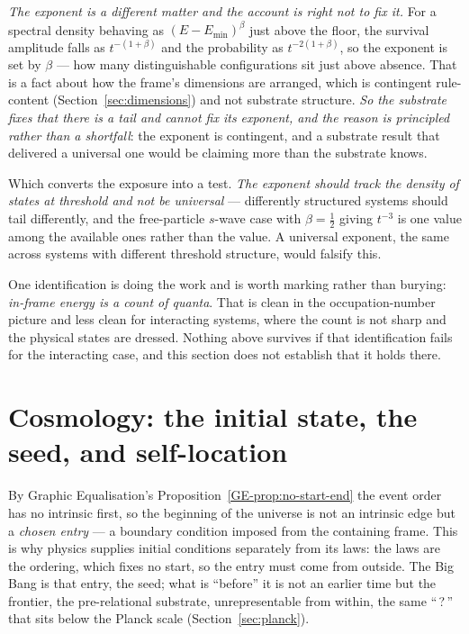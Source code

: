 \documentclass[11pt,a4paper]{article}
\theoremstyle{remark}\newtheorem{remark}[definition]{Remark}
\begin{document}
\emph{The exponent is a different matter and the account is right not to fix it.} For a spectral
density behaving as $(E-E_{\min})^{\beta}$ just above the floor, the survival amplitude falls as
$t^{-(1+\beta)}$ and the probability as $t^{-2(1+\beta)}$, so the exponent is set by $\beta$ --- how
many distinguishable configurations sit just above absence. That is a fact about how the frame's
dimensions are arranged, which is contingent rule-content (Section~\ref{sec:dimensions}) and not
substrate structure. \emph{So the substrate fixes that there is a tail and cannot fix its exponent,
and the reason is principled rather than a shortfall}: the exponent is contingent, and a substrate
result that delivered a universal one would be claiming more than the substrate knows.

Which converts the exposure into a test. \emph{The exponent should track the density of states at
threshold and not be universal} --- differently structured systems should tail differently, and the
free-particle $s$-wave case with $\beta=\tfrac12$ giving $t^{-3}$ is one value among the available
ones rather than the value. A universal exponent, the same across systems with different threshold
structure, would falsify this.

One identification is doing the work and is worth marking rather than burying: \emph{in-frame energy
is a count of quanta}. That is clean in the occupation-number picture and less clean for interacting
systems, where the count is not sharp and the physical states are dressed. Nothing above survives if
that identification fails for the interacting case, and this section does not establish that it
holds there.

\section{Cosmology: the initial state, the seed, and self-location}\label{sec:cosmology}
By Graphic Equalisation's Proposition~\ref{GE-prop:no-start-end} the event order has no intrinsic
first, so the beginning of the universe is not an intrinsic edge but a
\emph{chosen entry} --- a boundary condition imposed from the containing frame.
This is why physics supplies initial conditions separately from its laws: the
laws are the ordering, which fixes no start, so the entry must come from outside.
The Big Bang is that entry, the seed; what is ``before'' it is not an earlier
time but the frontier, the pre-relational substrate, unrepresentable from within,
the same ``\,?\,'' that sits below the Planck scale (Section~\ref{sec:planck}).
\end{document}
